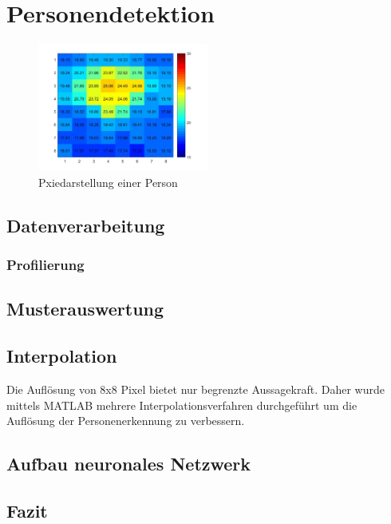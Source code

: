 \chapter{Personendetektion}
\label{chap:Personendetektion}



\begin{figure}[H]
	\centering
	\includegraphics[width=0.5\textwidth]
	{fig/person_175_shirt.jpg}
	\caption[Pixeldarstellung einer Person]{Pxiedarstellung einer Person}
	\label{fig:Pixelbild}
\end{figure}


\section{Datenverarbeitung}

\subsection{Profilierung}





\section{Musterauswertung}



\section{Interpolation}

Die Auflösung von 8x8 Pixel bietet nur begrenzte Aussagekraft. Daher wurde mittels MATLAB mehrere Interpolationsverfahren durchgeführt um die Auflösung der Personenerkennung zu verbessern.





\section{Aufbau neuronales Netzwerk}






\section{Fazit}